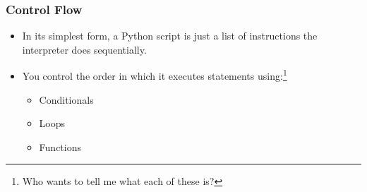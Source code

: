 \documentclass{beamer}
\begin{document}
\begin{frame}
  \frametitle{Control Flow}
  \begin{itemize}
    \item In its simplest form, a Python script is just a list of instructions
          the interpreter does sequentially.
    \pause
    \item You control the order in which it executes statements using:\footnote{Who wants to tell me what each of these is?}
    \begin{itemize}
      \item Conditionals
      \item Loops
      \item Functions
    \end{itemize}
  \end{itemize}

\end{frame}
\end{document}
